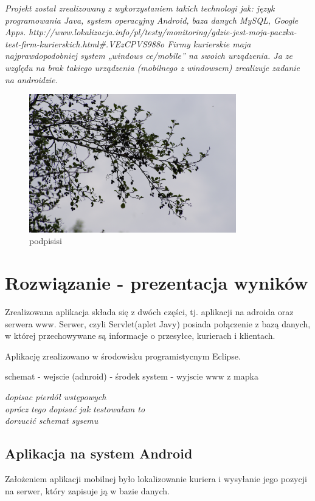 \documentclass[eng,printmode,oneside]{mgr}
\begin{document}
\emph{\color{komentarz}
Projekt został zrealizowany z wykorzystaniem takich
technologi jak:
język programowania Java, system operacyjny Android, baza danych MySQL, Google Apps.
http://www.lokalizacja.info/pl/testy/monitoring/gdzie-jest-moja-paczka-test-firm-kurierskich.html\#.VEzCPVS988o
Firmy kurierskie maja najprawdopodobniej system „windows ce/mobile” na swoich urządzenia. Ja ze względu na brak takiego urządzenia (mobilnego z windowsem) 
zrealizuje zadanie na androidzie.
}

\begin{figure}[ht!]
\centering
\includegraphics[width=90mm]{obr.jpg}
\caption{podpisisi}
\end{figure}
\chapter{Rozwiązanie - prezentacja wyników}


Zrealizowana aplikacja składa się z dwóch części, tj. aplikacji na adroida oraz
serwera www. Serwer, czyli Servlet(aplet Javy) posiada połączenie z bazą
danych, w której przechowywane są informacje o przesyłce, kurierach i
klientach. 

Aplikację zrealizowano w środowisku programistycnym Eclipse.

schemat - wejscie (adnroid) - środek system - wyjscie www z mapka

\emph{\color{komentarz} dopisac pierdół wstępowych\\oprócz tego dopisać jak
testowałam to\\dorzucić schemat sysemu}
\section{Aplikacja na system Android}

Założeniem aplikacji mobilnej było lokalizowanie kuriera i wysyłanie jego
pozycji na serwer, który zapisuje ją w bazie danych. 
\end{document}
